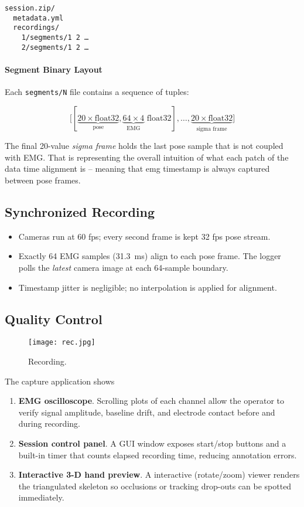 \begin{verbatim}
session.zip/
  metadata.yml
  recordings/
    1/segments/1 2 …
    2/segments/1 2 …
\end{verbatim}

\paragraph{Segment Binary Layout}

Each \texttt{segments/N} file contains a sequence of tuples:

\[
\bigl[
  [\underbrace{20\! \times\! \text{float32}}_{\text{pose}},
   \underbrace{64\!\times\!4}_{\text{EMG}}\text{ float32}],
  \dots,
  \underbrace{20\! \times\! \text{float32}}_{\text{sigma frame}}
\bigr]
\]

The final 20-value \emph{sigma frame} holds the last pose sample that is not coupled with EMG. That is representing the overall intuition of what each patch of the data time alignment is -- meaning that emg timestamp is always captured between pose frames.

\subsection{Synchronized Recording}

\begin{itemize}
  \item Cameras run at 60 fps; every second frame is kept 32 fps pose stream.
  \item Exactly 64 EMG samples (\SI{31.3}{ms}) align to each pose frame. The
        logger polls the \emph{latest} camera image at each 64-sample boundary.
  \item Timestamp jitter is negligible; no interpolation is
        applied for alignment.
\end{itemize}

\subsection{Quality Control}

\begin{figure}[H]
    \centering
    \texttt{[image: rec.jpg]}
    \caption{Recording.}
    \label{fig:recording}
\end{figure}

The capture application shows

\begin{enumerate}[label=\alph*]
    \item \textbf{EMG oscilloscope}.
          Scrolling plots of each channel allow the operator to verify signal amplitude, baseline drift, and electrode contact before and during recording.
    \item \textbf{Session control panel}.
          A GUI window exposes start/stop buttons and a built-in timer that counts elapsed recording time, reducing annotation errors.
    \item \textbf{Interactive 3-D hand preview}.
          A interactive (rotate/zoom) viewer renders the triangulated skeleton so occlusions or tracking drop-outs can be spotted immediately.
\end{enumerate}

